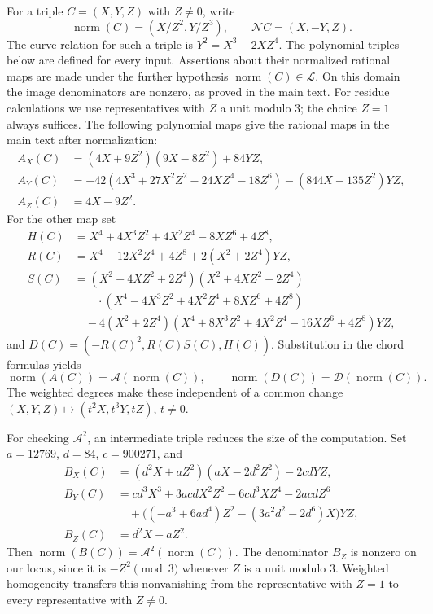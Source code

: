 \documentclass[11pt,a4paper]{article}
\theoremstyle{definition}
\newcommand{\NN}{\mathcal N}
\renewcommand{\AA}{\mathcal A}
\newcommand{\DD}{\mathcal D}
\newcommand{\normcoord}{\operatorname{norm}}
\begin{document}
For a triple \(C=(X,Y,Z)\) with \(Z\ne0\), write
\[
 \normcoord(C)=(X/Z^2,Y/Z^3),\qquad
 \NN C=(X,-Y,Z).
\]
The curve relation for such a triple is
\(Y^2=X^3-2XZ^4\). The polynomial triples below are defined for
every input. Assertions about their normalized rational maps are made
under the further hypothesis \(\normcoord(C)\in\mathcal L\).
On this domain the image denominators are nonzero, as proved in the
main text. For residue calculations we use representatives with
\(Z\) a unit modulo \(3\); the choice \(Z=1\) always suffices.
The following polynomial maps give the rational maps in the main text
after normalization:
\begin{align*}
 A_X(C)&=(4X+9Z^2)(9X-8Z^2)+84YZ,\\
 A_Y(C)&=-42(4X^3+27X^2Z^2-24XZ^4-18Z^6)
                  -(844X-135Z^2)YZ,\\
 A_Z(C)&=4X-9Z^2.
\end{align*}
For the other map set
\begin{align*}
 H(C)&=X^4+4X^3Z^2+4X^2Z^4-8XZ^6+4Z^8,\\
 R(C)&=X^4-12X^2Z^4+4Z^8+2(X^2+2Z^4)YZ,\\
 S(C)&=(X^2-4XZ^2+2Z^4)(X^2+4XZ^2+2Z^4)\\
     &\qquad\cdot(X^4-4X^3Z^2+4X^2Z^4+8XZ^6+4Z^8)\\
     &\quad-4(X^2+2Z^4)
           (X^4+8X^3Z^2+4X^2Z^4-16XZ^6+4Z^8)YZ,
\end{align*}
and \(D(C)=(-R(C)^2,R(C)S(C),H(C))\).
Substitution in the chord formulas yields
\[
 \normcoord(A(C))=\AA(\normcoord(C)),\qquad
 \normcoord(D(C))=\DD(\normcoord(C)).
\]
The weighted degrees make these independent of a common change
\((X,Y,Z)\mapsto(t^2X,t^3Y,tZ)\), \(t\ne0\).

For checking \(\AA^2\), an intermediate triple reduces the size
of the computation. Set \(a=12769\), \(d=84\), \(c=900271\), and
\begin{align*}
 B_X(C)&=(d^2X+aZ^2)(aX-2d^2Z^2)-2cdYZ,\\
 B_Y(C)&=cd^3X^3+3acdX^2Z^2-6cd^3XZ^4-2acdZ^6\\
       &\quad+\bigl((-a^3+6ad^4)Z^2-(3a^2d^2-2d^6)X\bigr)YZ,\\
 B_Z(C)&=d^2X-aZ^2.
\end{align*}
Then \(\normcoord(B(C))=\AA^2(\normcoord(C))\).
The denominator \(B_Z\) is nonzero on our locus, since it is
\(-Z^2\pmod3\) whenever \(Z\) is a unit modulo \(3\).
Weighted homogeneity transfers this nonvanishing from the representative
with \(Z=1\) to every representative with \(Z\ne0\).
\end{document}

